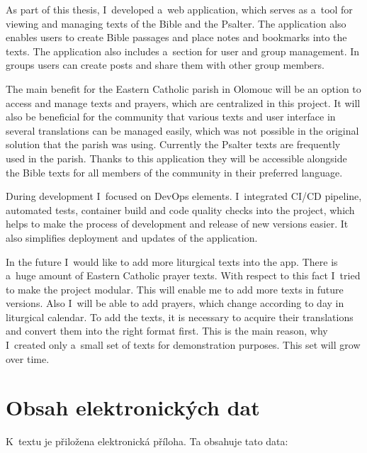\documentclass[
  tables=false,
  glossaries,
  index
]{kidiplom}
\begin{document}
\begin{kiconclusions}[english]
	As part of this thesis, I~developed a~web application, which serves as a~tool for viewing and managing texts of the Bible and the Psalter. The application also enables users to create Bible passages and place notes and bookmarks into the texts. The application also includes a~section for user and group management. In groups users can create posts and share them with other group members.

	The main benefit for the Eastern Catholic parish in Olomouc will be an option to access and manage texts and prayers, which are centralized in this project. It will also be beneficial for the community that various texts and user interface in several translations can be managed easily, which was not possible in the original solution that the parish was using. Currently the Psalter texts are frequently used in the parish. Thanks to this application they will be accessible alongside the Bible texts for all members of the community in their preferred language.

	During development I~focused on DevOps elements. I~integrated CI/CD pipeline, automated tests, container build and code quality checks into the project, which helps to make the process of development and release of new versions easier. It also simplifies deployment and updates of the application.

	In the future I~would like to add more liturgical texts into the app. There is a~huge amount of Eastern Catholic prayer texts. With respect to this fact I~tried to make the project modular. This will enable me to add more texts in future versions. Also I~will be able to add prayers, which change according to day in liturgical calendar. To add the texts, it is necessary to acquire their translations and convert them into the right format first. This is the main reason, why I~created only a~small set of texts for demonstration purposes. This set will grow over time.
\end{kiconclusions}


\appendix

\section{Obsah elektronických dat} \label{sec:ObsahData}

K~textu je přiložena elektronická příloha. Ta obsahuje tato data:
\end{document}

